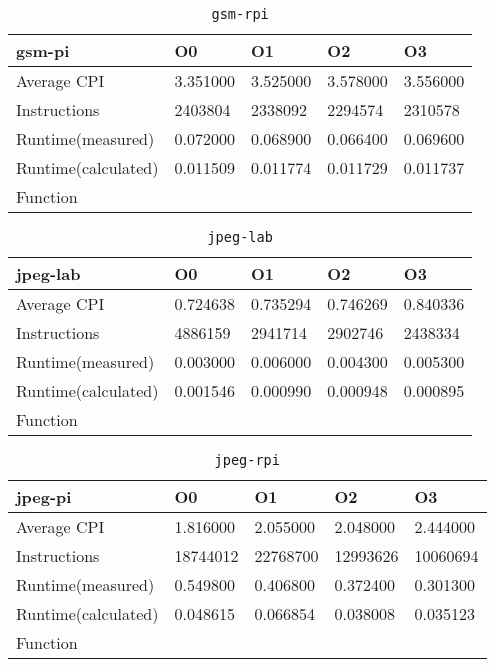 \begin{table}[ht!]
\centering
\caption{\texttt{gsm-rpi}}
\label{tab:gsm-rpi}
\begin{tabular}{|l|l|l|l|l|}
\hline
\textbf{gsm-pi}	&	\textbf{O0}	&	\textbf{O1}	&	\textbf{O2}	&	\textbf{O3}	\\\hline\hline
Average CPI	&	3.351000	&	3.525000	&	3.578000	&	3.556000	\\\hline
Instructions	&	2403804	&	2338092	&	2294574	&	2310578	\\\hline
Runtime(measured)	&	0.072000	&	0.068900	&	0.066400	&	0.069600	\\\hline
Runtime(calculated)	&	0.011509	&	0.011774	&	0.011729	&	0.011737	\\\hline
Function	&		&		&		&		\\\hline
\end{tabular}
\end{table}
\begin{table}[ht!]
\centering
\caption{\texttt{jpeg-lab}}
\label{tab:jpeg-lab}
\begin{tabular}{|l|l|l|l|l|}
\hline
\textbf{jpeg-lab}	&	\textbf{O0}	&	\textbf{O1}	&	\textbf{O2}	&	\textbf{O3}	\\\hline\hline
Average CPI	&	0.724638	&	0.735294	&	0.746269	&	0.840336	\\\hline
Instructions	&	4886159	&	2941714	&	2902746	&	2438334	\\\hline
Runtime(measured)	&	0.003000	&	0.006000	&	0.004300	&	0.005300	\\\hline
Runtime(calculated)	&	0.001546	&	0.000990	&	0.000948	&	0.000895	\\\hline
Function	&		&		&		&		\\\hline
\end{tabular}
\end{table}
\begin{table}[ht!]
\centering
\caption{\texttt{jpeg-rpi}}
\label{tab:jpeg-rpi}
\begin{tabular}{|l|l|l|l|l|}
\hline
\textbf{jpeg-pi}	&	\textbf{O0}	&	\textbf{O1}	&	\textbf{O2}	&	\textbf{O3}	\\\hline\hline
Average CPI	&	1.816000	&	2.055000	&	2.048000	&	2.444000	\\\hline
Instructions	&	18744012	&	22768700	&	12993626	&	10060694	\\\hline
Runtime(measured)	&	0.549800	&	0.406800	&	0.372400	&	0.301300	\\\hline
Runtime(calculated)	&	0.048615	&	0.066854	&	0.038008	&	0.035123	\\\hline
Function	&		&		&		&		\\\hline
\end{tabular}
\end{table}
